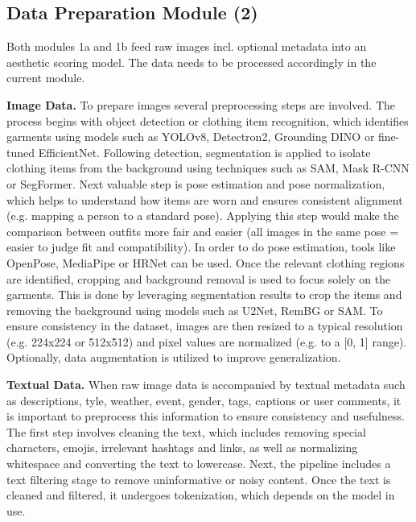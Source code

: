 \subsection{Data Preparation Module (2)}

Both modules 1a and 1b feed raw images incl. optional metadata into an aesthetic scoring model. The data needs to be processed accordingly in the current module.

\vspace{0.5cm}

\textbf{Image Data.}
To prepare images several preprocessing steps are involved. The process begins with object detection or clothing item recognition, which identifies garments using models such as YOLOv8, Detectron2, Grounding DINO or fine-tuned EfficientNet. Following detection, segmentation is applied to isolate clothing items from the background using techniques such as \acs{SAM}, Mask R-CNN or SegFormer. Next valuable step is pose estimation and pose normalization, which helps to understand how items are worn and ensures consistent alignment (e.g. mapping a person to a standard pose). Applying this step would make the comparison between outfits more fair and easier (all images in the same pose = easier to judge fit and compatibility). In order to do pose estimation, tools like OpenPose, MediaPipe or HRNet can be used. Once the relevant clothing regions are identified, cropping and background removal is used to focus solely on the garments. This is done by leveraging segmentation results to crop the items and removing the background using models such as U2Net, RemBG or \acs{SAM}. To ensure consistency in the dataset, images are then resized to a typical resolution (e.g. 224x224 or 512x512) and pixel values are normalized (e.g. to a [0, 1] range). Optionally, data augmentation is utilized to improve generalization.

\vspace{0.5cm}

\textbf{Textual Data.}
When raw image data is accompanied by textual metadata such as descriptions, tyle,
weather, event, gender, tags, captions or user comments, it is important to preprocess this information to ensure consistency and usefulness. The first step involves cleaning the text, which includes removing special characters, emojis, irrelevant hashtags and links, as well as normalizing whitespace and converting the text to lowercase. Next, the pipeline includes a text filtering stage to remove uninformative or noisy content. Once the text is cleaned and filtered, it undergoes tokenization, which depends on the model in use.

